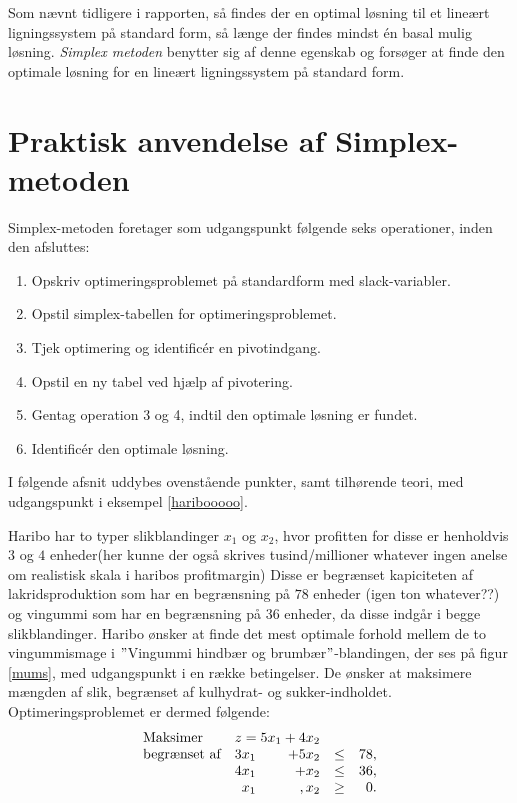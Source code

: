 Som nævnt tidligere i rapporten, så findes der en optimal løsning til et lineært ligningssystem på standard form, så længe der findes mindst én basal mulig løsning. 
\textit{Simplex metoden} benytter sig af denne egenskab og forsøger at finde den optimale løsning for en lineært ligningssystem på standard form.
%
%
\section{Praktisk anvendelse af Simplex-metoden}
Simplex-metoden foretager som udgangspunkt følgende seks operationer, inden den afsluttes: 
%
\begin{col}{}{}
%
\begin{enumerate}
\item Opskriv optimeringsproblemet på standardform med slack-variabler.  %
\item Opstil simplex-tabellen for optimeringsproblemet.					 %
\item Tjek optimering og identificér en pivotindgang.					 %
\item Opstil en ny tabel ved hjælp af pivotering. 						 %
\item Gentag operation 3 og 4, indtil den optimale løsning er fundet. 					 %
\item Identificér den optimale løsning.									 %
\end{enumerate}
%
\end{col}
\noindent
%
I følgende afsnit uddybes ovenstående punkter, samt tilhørende teori, med udgangspunkt i eksempel \ref{haribooooo}.
%
\\
%
\begin{eks}
\label{haribooooo}
Haribo har to typer slikblandinger $x_1$ og $x_2$, hvor profitten for disse er henholdvis $3$ og $4$ enheder(her kunne der også skrives tusind/millioner whatever ingen anelse om realistisk skala i haribos profitmargin)
Disse er begrænset kapiciteten af lakridsproduktion som har en begrænsning på $78$ enheder (igen ton whatever??) og vingummi som har en begrænsning på $36$ enheder, da disse indgår i begge slikblandinger.
%
Haribo ønsker at finde det mest optimale forhold mellem de to vingummismage i $"$Vingummi hindbær og brumbær$"$-blandingen, der ses på figur \ref{mums}, med udgangspunkt i en række betingelser. 
De ønsker at maksimere mængden af slik, begrænset af kulhydrat- og sukker-indholdet.
%
Optimeringsproblemet er dermed følgende:
%
\begin{align*}
\begin{array}{lrrlr} 
\text{Maksimer}		&	\multicolumn{2}{c}{z=5x_1+4x_2}  &\\
\text{begrænset af}	&3x_1& +5x_2			&\leq 	&78,\\
					&4x_1& + x_2				&\leq	& 36,\\
					&x_1& , x_2				&\geq	& 0.
\end{array}
\end{align*}
%
\end{eks}

